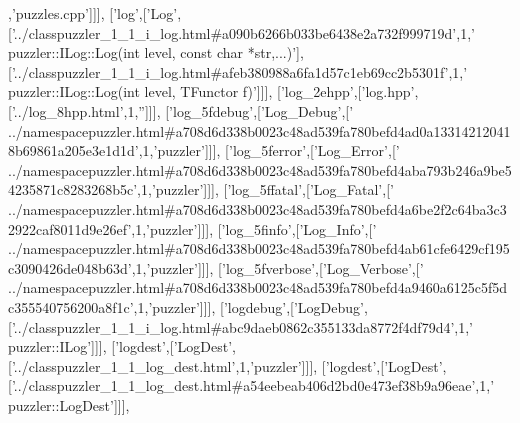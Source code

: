 \begin{DoxyCode}
      ,\textcolor{stringliteral}{'puzzles.cpp'}]]],
  [\textcolor{stringliteral}{'log'},[\textcolor{stringliteral}{'Log'},[\textcolor{stringliteral}{'../classpuzzler\_1\_1\_i\_log.html#a090b6266b033be6438e2a732f999719d'},1,\textcolor{stringliteral}{'
      puzzler::ILog::Log(int level, const char *str,...)'}],[\textcolor{stringliteral}{'../classpuzzler\_1\_1\_i\_log.html#afeb380988a6fa1d57c1eb69cc2b5301f'},1,\textcolor{stringliteral}{'
      puzzler::ILog::Log(int level, TFunctor f)'}]]],
  [\textcolor{stringliteral}{'log\_2ehpp'},[\textcolor{stringliteral}{'log.hpp'},[\textcolor{stringliteral}{'../log\_8hpp.html'},1,\textcolor{stringliteral}{''}]]],
  [\textcolor{stringliteral}{'log\_5fdebug'},[\textcolor{stringliteral}{'Log\_Debug'},[\textcolor{stringliteral}{'
      ../namespacepuzzler.html#a708d6d338b0023c48ad539fa780befd4ad0a133142120418b69861a205e3e1d1d'},1,\textcolor{stringliteral}{'puzzler'}]]],
  [\textcolor{stringliteral}{'log\_5ferror'},[\textcolor{stringliteral}{'Log\_Error'},[\textcolor{stringliteral}{'
      ../namespacepuzzler.html#a708d6d338b0023c48ad539fa780befd4aba793b246a9be54235871c8283268b5c'},1,\textcolor{stringliteral}{'puzzler'}]]],
  [\textcolor{stringliteral}{'log\_5ffatal'},[\textcolor{stringliteral}{'Log\_Fatal'},[\textcolor{stringliteral}{'
      ../namespacepuzzler.html#a708d6d338b0023c48ad539fa780befd4a6be2f2c64ba3c32922caf8011d9e26ef'},1,\textcolor{stringliteral}{'puzzler'}]]],
  [\textcolor{stringliteral}{'log\_5finfo'},[\textcolor{stringliteral}{'Log\_Info'},[\textcolor{stringliteral}{'
      ../namespacepuzzler.html#a708d6d338b0023c48ad539fa780befd4ab61cfe6429cf195c3090426de048b63d'},1,\textcolor{stringliteral}{'puzzler'}]]],
  [\textcolor{stringliteral}{'log\_5fverbose'},[\textcolor{stringliteral}{'Log\_Verbose'},[\textcolor{stringliteral}{'
      ../namespacepuzzler.html#a708d6d338b0023c48ad539fa780befd4a9460a6125c5f5dc355540756200a8f1c'},1,\textcolor{stringliteral}{'puzzler'}]]],
  [\textcolor{stringliteral}{'logdebug'},[\textcolor{stringliteral}{'LogDebug'},[\textcolor{stringliteral}{'../classpuzzler\_1\_1\_i\_log.html#abc9daeb0862c355133da8772f4df79d4'},1,\textcolor{stringliteral}{'
      puzzler::ILog'}]]],
  [\textcolor{stringliteral}{'logdest'},[\textcolor{stringliteral}{'LogDest'},[\textcolor{stringliteral}{'../classpuzzler\_1\_1\_log\_dest.html'},1,\textcolor{stringliteral}{'puzzler'}]]],
  [\textcolor{stringliteral}{'logdest'},[\textcolor{stringliteral}{'LogDest'},[\textcolor{stringliteral}{'../classpuzzler\_1\_1\_log\_dest.html#a54eebeab406d2bd0e473ef38b9a96eae'},1,\textcolor{stringliteral}{'
      puzzler::LogDest'}]]],

\end{DoxyCode}
